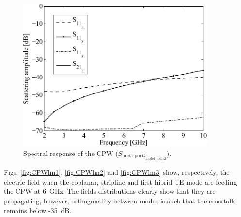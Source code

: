 \begin{figure}[ht!]
\centering
\includegraphics[width=10cm]{CPWlinScat}
\caption{Spectral response of the CPW ($S_{{\text{port1|port2}}_{\text{mode1|mode2}}}$). }
\label{fig:Scattering}
\end{figure}
%

Figs. \ref{fig:CPWlin1}, \ref{fig:CPWlin2} and \ref{fig:CPWlin3} show, respectively, the electric field when the coplanar, stripline and first hibrid TE mode are feeding the CPW at 6~GHz. The fields distributions clearly show that they are propagating, however, orthogonality between modes is such that the crosstalk remains below -35~dB.

